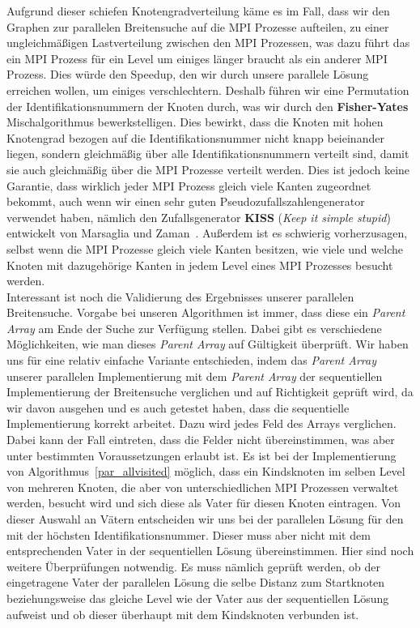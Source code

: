 \documentclass[11pt,a4paper]{article}
\begin{document}
Aufgrund dieser schiefen Knotengradverteilung käme es im Fall, dass wir den Graphen zur parallelen Breitensuche auf die MPI Prozesse aufteilen, zu einer ungleichmäßigen Lastverteilung zwischen den MPI Prozessen, was dazu führt das ein MPI Prozess für ein Level um einiges länger braucht als ein anderer MPI Prozess. Dies würde den Speedup, den wir durch unsere parallele Lösung erreichen wollen, um einiges verschlechtern. Deshalb führen wir eine Permutation der Identifikationsnummern der Knoten durch, was wir durch den \textbf{Fisher-Yates} Mischalgorithmus bewerkstelligen. Dies bewirkt, dass die Knoten mit hohen Knotengrad bezogen auf die Identifikationsnummer nicht knapp beieinander liegen, sondern gleichmäßig über alle Identifikationsnummern verteilt sind, damit sie auch gleichmäßig über die MPI Prozesse verteilt werden. Dies ist jedoch keine Garantie, dass wirklich jeder MPI Prozess gleich viele Kanten zugeordnet bekommt, auch wenn wir einen sehr guten Pseudozufallszahlengenerator verwendet haben, nämlich den Zufallsgenerator \textbf{KISS} (\textit{Keep it simple stupid}) entwickelt von Marsaglia und Zaman~\cite{kiss}. Außerdem ist es schwierig vorherzusagen, selbst wenn die MPI Prozesse gleich viele Kanten besitzen, wie viele und welche Knoten mit dazugehörige Kanten in jedem Level eines MPI Prozesses besucht werden.\\
Interessant ist noch die Validierung des Ergebnisses unserer parallelen Breitensuche. Vorgabe bei unseren Algorithmen ist immer, dass diese ein \textit{Parent Array} am Ende der Suche zur Verfügung stellen. Dabei gibt es verschiedene Möglichkeiten, wie man dieses \textit{Parent Array} auf Gültigkeit überprüft. Wir haben uns für eine relativ einfache Variante entschieden, indem das \textit{Parent Array} unserer parallelen Implementierung mit dem \textit{Parent Array} der sequentiellen Implementierung der Breitensuche verglichen und auf Richtigkeit geprüft wird, da wir davon ausgehen und es auch getestet haben, dass die sequentielle Implementierung korrekt arbeitet. Dazu wird jedes Feld des Arrays verglichen. Dabei kann der Fall eintreten, dass die Felder nicht übereinstimmen, was aber unter bestimmten Voraussetzungen erlaubt ist. Es ist bei der Implementierung von Algorithmus~\ref{par_allvisited} möglich, dass ein Kindsknoten im selben Level von mehreren Knoten, die aber von unterschiedlichen MPI Prozessen verwaltet werden, besucht wird und sich diese als Vater für diesen Knoten eintragen. Von dieser Auswahl an Vätern entscheiden wir uns bei der parallelen Lösung für den mit der höchsten Identifikationsnummer. Dieser muss aber nicht mit dem entsprechenden Vater in der sequentiellen Lösung übereinstimmen. Hier sind noch weitere Überprüfungen notwendig. Es muss nämlich geprüft werden, ob der eingetragene Vater der parallelen Lösung die selbe Distanz zum Startknoten beziehungsweise das gleiche Level wie der Vater aus der sequentiellen Lösung aufweist und ob dieser überhaupt mit dem Kindsknoten verbunden ist.\\
\end{document}
